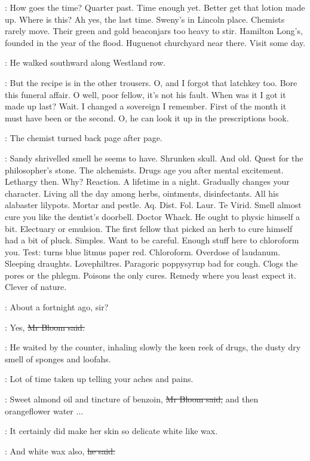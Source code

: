 \BloomInt:
How goes the time?
Quarter past.
Time enough yet.
Better get that lotion made up.
Where is this?
Ah yes, the last time.
Sweny's in Lincoln place.
Chemists rarely move.
Their green and gold beaconjars too heavy to stir.
Hamilton Long's, founded in the year of the flood.
Huguenot churchyard near there.
Visit some day.

:
He walked southward along Westland row.

\BloomInt:
But the recipe is in the other trousers.
O, and I forgot that latchkey too.
Bore
this funeral affair.
O well, poor fellow,
it's not his fault.
When was it I got it made up last?
Wait.
I changed a sovereign I remember.
First of the month it must have been
or the second.
O, he can look it up in the prescriptions book.

:
The chemist turned back page after page.

\BloomInt:
Sandy shrivelled smell he seems to have.
Shrunken skull.
And old.
Quest for the philosopher's stone.
The alchemists.
Drugs age you after mental excitement.
Lethargy then.
Why?
Reaction.
A lifetime in a night.
Gradually changes your character.
Living all the day among herbs, ointments, disinfectants.
All his alabaster lilypots.
Mortar and pestle.
Aq.
Dist.
Fol.
Laur.
Te Virid.
Smell almost cure you like the dentist's doorbell.
Doctor Whack.
He ought to physic himself a bit.
Electuary or emulsion.
The first fellow that picked an herb to cure himself had a bit of pluck.
Simples.
Want to be careful.
Enough stuff here to chloroform you.
Test: turns blue litmus paper red.
Chloroform.
Overdose of laudanum.
Sleeping draughts.
Lovephiltres.
Paragoric poppysyrup bad for cough.
Clogs the pores or the phlegm.
Poisons the only cures.
Remedy where you least expect it.
Clever of nature.

\sweny:
About a fortnight ago, sir?

\Bloom:
Yes,
\sout{Mr Bloom said.}

:
He waited by the counter,
inhaling slowly the keen reek of drugs,
the dusty dry smell of sponges and loofahs.

\BloomInt:
Lot of time taken up telling your
aches and pains.

\Bloom:
Sweet almond oil and tincture of benzoin,
\sout{Mr Bloom said,}
and then orangeflower water ...

\BloomInt:
It certainly did make her skin so delicate white like wax.

\Bloom:
And white wax also,
\sout{he said.}

